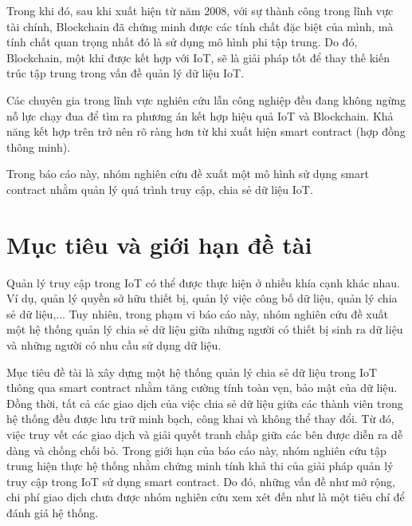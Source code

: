 Trong khi đó, sau khi xuất hiện từ năm 2008, với sự thành công trong lĩnh vực tài chính, Blockchain đã chứng minh được các tính chất đặc biệt của mình, mà tính chất quan trọng nhất đó là sử dụng mô hình phi tập trung. Do đó, Blockchain, một khi được kết hợp với IoT, sẽ là giải pháp tốt để thay thế kiến trúc tập trung trong vấn đề quản lý dữ liệu IoT.\par
Các chuyên gia trong lĩnh vực nghiên cứu lẫn công nghiệp đều đang không ngừng nỗ lực chạy đua để tìm ra phương án kết hợp hiệu quả IoT và Blockchain. Khả năng kết hợp trên trở nên rõ ràng hơn từ khi xuất hiện smart contract (hợp đồng thông minh).\par
Trong báo cáo này, nhóm nghiên cứu đề xuất một mô hình sử dụng smart contract nhằm quản lý quá trình truy cập, chia sẻ dữ liệu IoT. 




\section{Mục tiêu và giới hạn đề tài}
Quản lý truy cập trong IoT có thể được thực hiện ở nhiều khía cạnh khác nhau. Ví dụ, quản lý quyền sở hữu thiết bị, quản lý việc công bố dữ liệu, quản lý chia sẻ dữ liệu,... Tuy nhiên, trong phạm vi báo cáo này, nhóm nghiên cứu đề xuất một hệ thống quản lý chia sẻ dữ liệu giữa những người có thiết bị sinh ra dữ liệu và những người có nhu cầu sử dụng dữ liệu. \par
Mục tiêu đề tài là xây dựng một hệ thống quản lý chia sẻ dữ liệu trong IoT thông qua smart contract nhằm tăng cường tính toàn vẹn, bảo mật của dữ liệu. Đồng thời, tất cả các giao dịch của việc chia sẻ dữ liệu giữa các thành viên trong hệ thống đều được lưu trữ minh bạch, công khai và không thể thay đổi. Từ đó, việc truy vết các giao dịch và giải quyết tranh chấp giữa các bên được diễn ra dễ dàng và chống chối bỏ. Trong giới hạn của báo cáo này, nhóm nghiên cứu tập trung hiện thực hệ thống nhằm chứng minh tính khả thi của giải pháp quản lý truy cập trong IoT sử dụng smart contract. Do đó, những vấn đề như mở rộng, chi phí giao dịch chưa được nhóm nghiên cứu xem xét đến như là một tiêu chí để đánh giá hệ thống.



